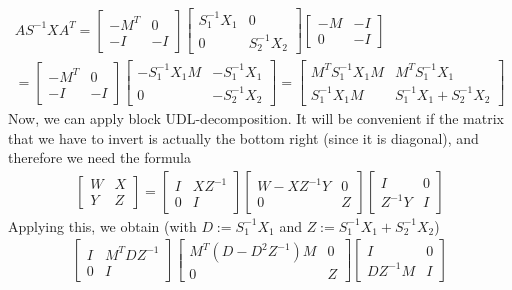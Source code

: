 \documentclass{article}
\begin{document}
\begin{align}
		AS^{-1}XA^T = 
		\begin{bmatrix}
				-M^T & 0\\
				-I & -I
		\end{bmatrix}
		\begin{bmatrix}
				S_1^{-1}X_1 & 0\\
				0 & S_2^{-1}X_2
		\end{bmatrix}
		\begin{bmatrix}
				-M & -I\\
				0 & -I
		\end{bmatrix}\\
		= 
		\begin{bmatrix}
				-M^T & 0\\
				-I & -I
		\end{bmatrix}
		\begin{bmatrix}
				-S_1^{-1}X_1M & -S_1^{-1}X_1\\
				0 & -S_2^{-1} X_2
		\end{bmatrix}
		= 
		\begin{bmatrix}
				M^TS_1^{-1}X_1M & M^TS_1^{-1}X_1\\
				S_1^{-1} X_1 M & S_1^{-1}X_1 + S_2^{-1}X_2
		\end{bmatrix}
\end{align}
Now, we can apply block UDL-decomposition. It will be convenient if the matrix that we have to invert is actually the bottom right (since it is diagonal), and therefore we need the formula 
\begin{align}
		\begin{bmatrix}
				W & X\\
				Y & Z
		\end{bmatrix}
		=
		\begin{bmatrix}
				I & XZ^{-1}\\
				0 & I
		\end{bmatrix}
		\begin{bmatrix}
				W - XZ^{-1}Y & 0\\
				0 & Z
		\end{bmatrix}
		\begin{bmatrix}
				I & 0\\
				Z^{-1}Y & I
		\end{bmatrix}
\end{align}
Applying this, we obtain (with $D := S_1^{-1}X_1$ and $Z := S_1^{-1}X_1 + S_2^{-1}X_2$)
\begin{align}
		\begin{bmatrix}
				I & M^T DZ^{-1}\\
				0 & I
		\end{bmatrix}
		\begin{bmatrix}
				M^T(D - D^2Z^{-1})M & 0\\
				0 & Z
		\end{bmatrix}
		\begin{bmatrix}
				I & 0\\
				DZ^{-1} M & I
		\end{bmatrix}
\end{align}
\end{document}
